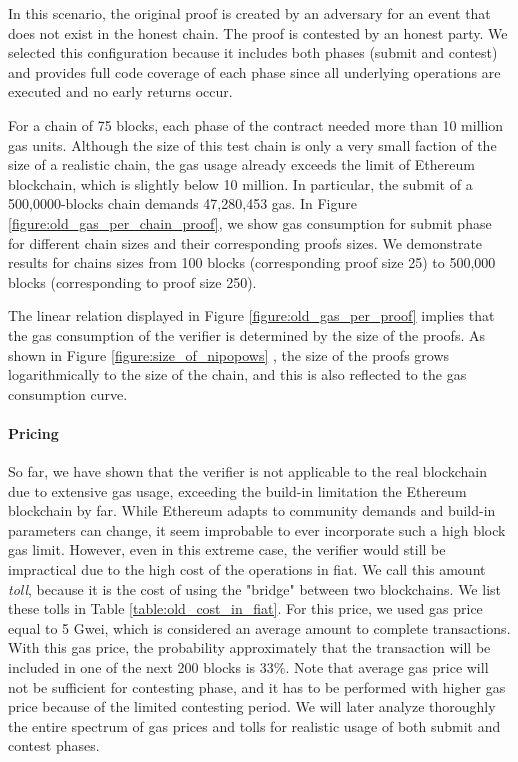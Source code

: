


In this scenario, the original proof is created by an adversary for an event
that does not exist in the honest chain. The proof is contested by an honest
party. We selected this configuration because it includes both phases
(submit and contest) and provides full code coverage of each phase since all
underlying operations are executed and no early returns occur.

For a chain of 75 blocks, each phase of the contract needed more than 10
million gas units. Although the size of this test chain is only a very small
faction of the size of a realistic chain, the gas usage already exceeds the
limit of Ethereum blockchain, which is slightly below 10 million. In
particular, the submit of a 500,0000-blocks chain demands 47,280,453 gas. In
Figure \ref{figure:old_gas_per_chain_proof}, we show gas consumption for submit
phase for different chain sizes and their corresponding proofs sizes. We
demonstrate results for chains sizes from 100 blocks (corresponding proof size
25) to 500,000 blocks (corresponding to proof size 250).

The linear relation displayed in Figure \ref{figure:old_gas_per_proof} implies
that the gas consumption of the verifier is determined by the size of the
proofs. As shown in Figure \ref{figure:size_of_nipopows} , the size of the
proofs grows logarithmically to the size of the chain, and this is also
reflected to the gas consumption curve.





\paragraph{Pricing}

So far, we have shown that the verifier is not applicable to the real
blockchain due to extensive gas usage, exceeding the build-in limitation the
Ethereum blockchain by far. While Ethereum adapts to community demands and
build-in parameters can change, it seem improbable to ever incorporate such a
high block gas limit. However, even in this extreme case, the verifier would
still be impractical due to the high cost of the operations in fiat. We call
this amount \emph{toll}, because it is the cost of using the "bridge" between
two blockchains. We list these tolls in Table \ref{table:old_cost_in_fiat}. For
this price, we used gas price equal to 5 Gwei, which is considered an average
amount to complete transactions. With this gas price, the probability
approximately that the transaction will be included in one of the next 200
blocks is 33\%. Note that average gas price will not be sufficient for
contesting phase, and it has to be performed with higher gas price because of
the limited contesting period. We will later analyze thoroughly the entire
spectrum of gas prices and tolls for realistic usage of both submit and contest
phases.

